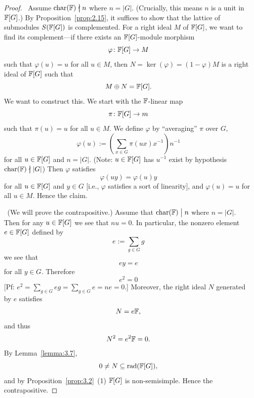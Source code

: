 \begin{proof}
\backwardproof\ Assume $\Char(\FF)\ndivides n$ where $n=|G|$.
(Crucially, this means $n$ is a unit in $\mathbb{F}[G]$.)
By Proposition~\ref{prop:2.15}, it suffices to show
that the lattice of submodules $S(\mathbb{F}[G])$ is complemented. For a
right ideal $M$ of $\mathbb{F}[G]$, we want to find its complement---if there
exists an $\mathbb{F}[G]$-module morphism
\begin{equation}
\varphi\colon\mathbb{F}[G]\to M
\end{equation}
such that $\varphi(u)=u$ for all $u\in M$, then $N=\ker(\varphi)=(1-\varphi)M$
is a right ideal of $\mathbb{F}[G]$ such that
\begin{equation}
M\oplus N=\mathbb{F}[G].
\end{equation}
We want to construct this. We start with the $\mathbb{F}$-linear map
\begin{equation}
\pi\colon\mathbb{F}[G]\to m
\end{equation}
such that $\pi(u)=u$ for all $u\in M$. We define $\varphi$ by
``averaging'' $\pi$ over $G$,
\begin{equation}
\varphi(u):=\left(\sum_{x\in G}\pi(ux)x^{-1}\right)n^{-1}
\end{equation}
for all $u\in\mathbb{F}[G]$ and $n=|G|$. (Note: $u\in\mathbb{F}[G]$ has $u^{-1}$
exist by hypothesis $\Char(\FF)\ndivides|G|$) Then $\varphi$ satisfies
\begin{equation}
\varphi(uy)=\varphi(u)y
\end{equation}
for all $u\in\mathbb{F}[G]$ and $y\in G$ [i.e., $\varphi$ satisfies a sort of
  linearity], and $\varphi(u)=u$ for all $u\in M$. Hence the claim.

\forwardproof\ (We will prove the contrapositive.)
Assume that $\Char(\FF)\divides n$ where $n=|G|$. Then for any
$u\in\mathbb{F}[G]$ we see that $nu=0$. In particular, the nonzero element
$e\in\mathbb{F}[G]$ defined by
\begin{equation}
e:=\sum_{g\in G}g
\end{equation}
we see that
\begin{equation}
ey=e
\end{equation}
for all $y\in G$. Therefore
\begin{equation}
e^{2}=0
\end{equation}
[Pf: $e^{2}=\sum_{g\in G}eg=\sum_{g\in G}e=ne=0$.]
Moreover, the right ideal $N$ generated by $e$ satisfies
\begin{equation}
N=e\mathbb{F},
\end{equation}
and thus
\begin{equation}
N^{2}=e^{2}\mathbb{F}=0.
\end{equation}
By Lemma~\ref{lemma:3.7},
\begin{equation}
0\neq N\subseteq\operatorname{rad}(\mathbb{F}[G]),
\end{equation}
and by Proposition~\ref{prop:3.2}~(1) $\mathbb{F}[G]$ is
non-semisimple. Hence the contrapositive.
\end{proof}

